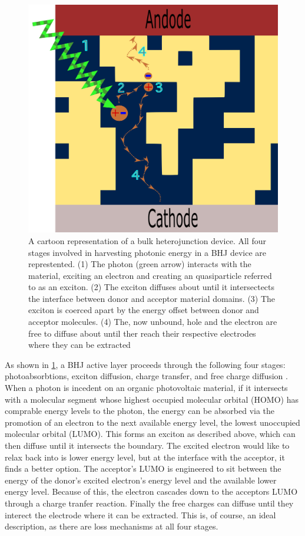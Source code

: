 \begin{figure}
    \center
    \includegraphics[width = .9\textwidth]{figures/BHJ-figure.png}
    \caption{A cartoon representation of a bulk heterojunction device. All four stages involved in harvesting
    photonic energy in a BHJ device are represtented. (1) The photon (green arrow) interacts with the material,
    exciting an electron and creating an quasiparticle referred to as an exciton. (2) The exciton diffuses
    about until it intersectects the interface between donor and acceptor material domains. (3) The exciton is
    coerced apart by the energy offset between donor and acceptor molecules. 
    (4) The, now unbound,  hole and the electron are free to diffuse about until ther reach their respective
    electrodes where they can be extracted \cite{Fusella2019}}
    \label{bhj}
\end{figure}

As shown in \ref{bhj}, a BHJ active layer proceeds through the following four stages: photoabsorbtions, 
exciton diffusion, charge transfer, and free charge diffusion \cite{Fusella2019}. 
When a photon is incedent on
an organic photovoltaic material, if it intersects with a molecular segment whose 
highest occupied molecular orbital (HOMO) has comprable energy levels to the photon, the energy can be absorbed via the promotion of
an electron to the next available energy level, the lowest unoccupied molecular orbital (LUMO).
This forms an exciton as
described above, which can then diffuse until it intersects the boundary. 
The excited electron would like to relax
back into is lower energy level, but at the interface with the acceptor, it finds a better option. The
acceptor's LUMO is engineered to sit between the energy of the donor's excited electron's energy level and the
available lower energy level. Because of this, the electron cascades down to the acceptors LUMO through a charge
tranfer reaction. Finally the free charges can diffuse until they interect the electrode where it can be
extracted. This is, of course, an ideal description, as there are loss mechanisms at all four stages. 

